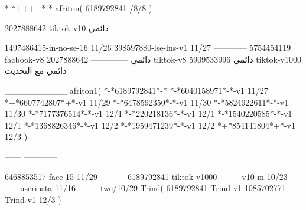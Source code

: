 *-*++++*-*
afriton(
6189792841 /8/8
)

2027888642 tiktok-v10
دائمي

1497486415-in-no-se-16 11/26
398597880-lse-ins-v1 11/27
------------
5754454119 facbook-v8
دائمي
--------------
2027888642 tiktok-v8
دائمي
5909533996 tiktok-v1000
دائمي مع التحديث

__________
afriton1(
*-*6189792841*-*
*-*6040158971*-*-v1 11/27
*+*6607742807*+*-v1 11/29
*-*6478592350*-*-v1 11/30
*-*5824922611*-*-v1 11/30
*-*7177376514*-*-v1 12/1
*-*220218136*-*-v1 12/1
*-*1540220585*-*-v1 12/1
*-*1368826346*-*-v1 12/2
*-*1959471239*-*-v1 12/2
*+*854141804*+*-v1 12/3
)

------
------------

6468853517-face-15 11/29
---------
6189792841 tiktok-v1000
------
-v10-m 10/23
-----
userinsta 11/16
------
-twe/10/29
Trind(
6189792841-Trind-v1 
1085702771-Trind-v1 12/3
)
